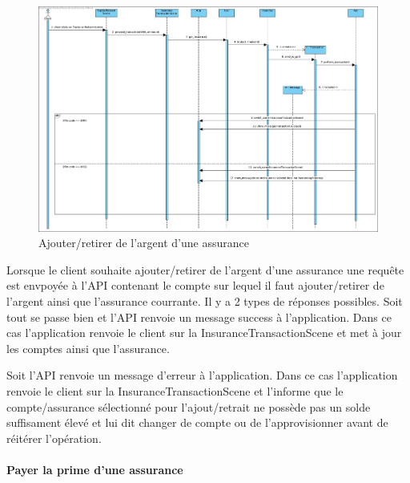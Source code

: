 \documentclass[../rapport.tex]{subfiles}
\begin{document}
						\begin{figure}[h]
								\centering\includegraphics[scale=0.25]{ressources/photos_diagrammes/extensionThomas/ajoutRetraitAssurance.jpg}
								\caption{Ajouter/retirer de l'argent d'une assurance} 
						\end{figure}

						Lorsque le client souhaite ajouter/retirer de l'argent d'une assurance une requête est envpoyée à l'API contenant le compte sur lequel il faut 
						ajouter/retirer de l'argent ainsi que l'assurance courrante. Il y a 2 types de réponses possibles. Soit tout se passe bien et l'API renvoie un
						message success à l'application. Dans ce cas l'application renvoie le client sur la InsuranceTransactionScene et met à jour les comptes ainsi 
						que l'assurance. 
						\medskip

						Soit l'API renvoie un message d'erreur à l'application. Dans ce cas l'application renvoie le client sur la InsuranceTransactionScene et l'informe
						que le compte/assurance sélectionné pour l'ajout/retrait ne possède pas un solde suffisament élevé et lui dit changer de compte ou de 
						l'approvisionner avant de réitérer l'opération.

\newpage 
				\paragraph{Payer la prime d'une assurance}
\end{document}
